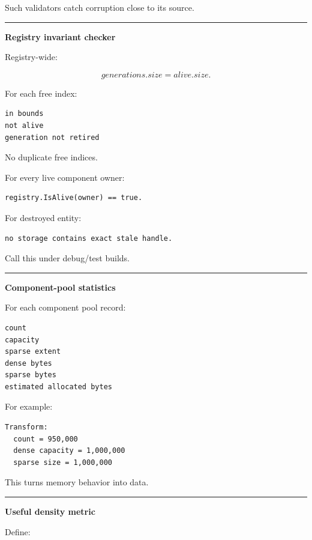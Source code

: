 Such validators catch corruption close to its source.

\begin{center}\rule{0.5\linewidth}{0.5pt}\end{center}

\textbf{Registry invariant checker}

Registry-wide:

\[
generations.size=alive.size.
\]

For each free index:

\begin{verbatim}
in bounds
not alive
generation not retired
\end{verbatim}

No duplicate free indices.

For every live component owner:

\begin{verbatim}
registry.IsAlive(owner) == true.
\end{verbatim}

For destroyed entity:

\begin{verbatim}
no storage contains exact stale handle.
\end{verbatim}

Call this under debug/test builds.

\begin{center}\rule{0.5\linewidth}{0.5pt}\end{center}

\textbf{Component-pool statistics}

For each component pool record:

\begin{verbatim}
count
capacity
sparse extent
dense bytes
sparse bytes
estimated allocated bytes
\end{verbatim}

For example:

\begin{verbatim}
Transform:
  count = 950,000
  dense capacity = 1,000,000
  sparse size = 1,000,000
\end{verbatim}

This turns memory behavior into data.

\begin{center}\rule{0.5\linewidth}{0.5pt}\end{center}

\textbf{Useful density metric}

Define:

